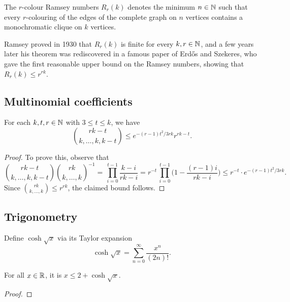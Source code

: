 \begin{definition}
  \label{def:R}
  The $r$-colour Ramsey numbers $R_r(k)$ denotes the minimum $n \in \mathbb{N}$ such that every $r$-colouring of the edges of the complete graph on $n$ vertices contains a monochromatic clique on $k$ vertices.
\end{definition}

Ramsey proved in 1930 that $R_r(k)$ is finite for every $k, r \in \mathbb{N}$, and a few years later his theorem was rediscovered in a famous paper of Erd\H{o}s and Szekeres, who gave the first reasonable upper bound on the Ramsey numbers, showing that $R_r(k) \le r^{rk}$.

\subsection{Multinomial coefficients}

\begin{lemma}  
  \label{lem:multibounds}
  For each $k,t,r \in \mathbb{N}$ with $3 \le t \le k$, we have
  $$\binom{rk-t}{k,\dots,k,k-t} \le e^{-(r-1)t^2/3rk} r^{rk-t}.$$
\end{lemma}
  
\begin{proof}
  To prove this, observe that 
  $$\binom{rk-t}{k,\dots,k,k-t} \binom{rk}{k,\dots,k}^{-1} = \, \prod_{i = 0}^{t - 1} \frac{k - i}{rk - i} = r^{-t} \,\prod_{i = 0}^{t-1} \bigg( 1 - \frac{(r-1)i}{rk - i} \bigg) \le r^{-t} \cdot e^{-(r-1)t^2/3rk}.$$
  Since $\binom{rk}{k,\dots,k} \le r^{rk}$, the claimed bound follows.
\end{proof}


\subsection{Trigonometry}

\begin{definition}
  \label{def:coshsqrt}
  \leanok
  Define $\cosh \sqrt{x}$ via its Taylor expansion
  $$\cosh\sqrt{x} = \sum_{n = 0}^\infty \frac{x^n}{(2n)!}.$$
\end{definition}

\begin{lemma}
  \label{lem:le-coshsqrt}
  For all $x \in \mathbb{R}$, it is $x \le 2 + \cosh\sqrt{x}$.
\end{lemma}
\begin{proof}
\end{proof}

